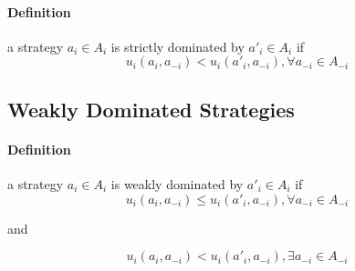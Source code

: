 \paragraph{Definition}a strategy $a_i \in A_i $ is strictly dominated by $a'_i \in A_i$ if
\begin{equation} u_i(a_i, a_{-i}) < u_i(a'_i, a_{-i}) ,  \forall   a_{-i} \in A_{-i} \end{equation}

\subsection{Weakly Dominated Strategies}
\paragraph{Definition}a strategy $a_i \in A_i $ is weakly dominated by $a'_i \in A_i$ if
\begin{equation} u_i(a_i, a_{-i}) \leq u_i(a'_i, a_{-i}) ,  \forall   a_{-i} \in A_{-i} \end{equation}
\begin{center}
and 
\end{center}
\begin{equation} u_i(a_i, a_{-i}) < u_i(a'_i, a_{-i}) ,\exists   a_{-i} \in A_{-i} \end{equation} 

